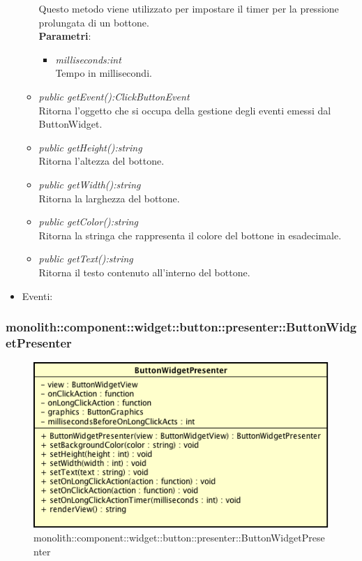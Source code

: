 \begin{itemize}
\begin{itemize}
		Questo metodo viene utilizzato per impostare il timer per la pressione prolungata di un bottone.
				\\ \textbf{Parametri}: \begin{itemize}
				\item \textit{milliseconds:int}\\
				Tempo in millisecondi.
	\end{itemize}
	\item \textit{public getEvent():ClickButtonEvent}\\
	Ritorna l'oggetto che si occupa della gestione degli eventi emessi dal ButtonWidget.
	\item \textit{public getHeight():string}\\
	Ritorna l'altezza del bottone.
	\item \textit{public getWidth():string}\\
	Ritorna la larghezza del bottone.
	\item \textit{public getColor():string}\\
	Ritorna la stringa che rappresenta il colore del bottone in esadecimale.
	\item \textit{public getText():string}\\
	Ritorna il testo contenuto all'interno del bottone.
	\end{itemize}
\item{Eventi}:
\end{itemize}

\subsubsection{monolith::component::widget::button::presenter::ButtonWidgetPresenter}

\label{monolith::component::widget::button::presenter::ButtonWidgetPresenter}
\begin{figure}[H]
	\centering
	\includegraphics[scale=0.5]{Sezioni/SottosezioniST/img/ButtonWidgetPresenter.png}
	\caption{monolith::component::widget::button::presenter::ButtonWidgetPresenter}
\end{figure}

